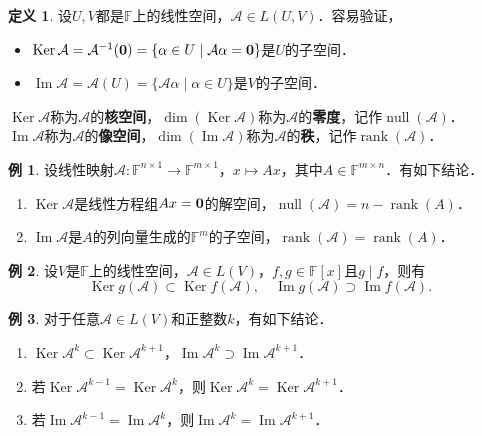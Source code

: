\documentclass[a4paper,fontset=windows]{ctexbook}
\theoremstyle{definition}
\newtheorem{definition}{定义}[chapter]
\newtheorem{example}{例}[chapter]
\DeclareMathOperator{\im}{Im}
\DeclareMathOperator{\Ker}{Ker}
\DeclareMathOperator{\Null}{null}
\DeclareMathOperator{\rank}{rank}
\begin{document}
\begin{definition}
设$U,V$都是$\mathbb{F}$上的线性空间，$\mathcal{A}\in L(U,V)$．容易验证，
\begin{itemize}
\item $\Ker\mathcal{A}=\mathcal{A}^{-1}({\bf 0})=\{\alpha\in U\mid\mathcal{A}\alpha={\bf 0}\}$是$U$的子空间．
\item $\im\mathcal{A}=\mathcal{A}(U)=\{\mathcal{A}\alpha\mid\alpha\in U\}$是$V$的子空间．
\end{itemize}
$\Ker\mathcal{A}$称为$\mathcal{A}$的{\bf 核空间}，$\dim(\Ker\mathcal{A})$称为$\mathcal{A}$的{\bf 零度}，记作$\Null(\mathcal{A})$．\\
$\im\mathcal{A}$称为$\mathcal{A}$的{\bf 像空间}，$\dim(\im\mathcal{A})$称为$\mathcal{A}$的{\bf 秩}，记作$\rank(\mathcal{A})$．
\end{definition}

\begin{example}
设线性映射$\mathcal{A}:\mathbb{F}^{n\times 1}\to\mathbb{F}^{m\times 1}$，$x\mapsto Ax$，其中$A\in\mathbb{F}^{m\times n}$．有如下结论．
\begin{enumerate}
\item $\Ker\mathcal{A}$是线性方程组$Ax={\bf 0}$的解空间，$\Null(\mathcal{A})=n-\rank(A)$．

\item $\im\mathcal{A}$是$A$的列向量生成的$\mathbb{F}^m$的子空间，$\rank(\mathcal{A})=\rank(A)$．
\end{enumerate}
\end{example}

\begin{example}
设$V$是$\mathbb{F}$上的线性空间，$\mathcal{A}\in L(V)$，$f,g\in\mathbb{F}[x]$且$g\mid f$，则有
$$\Ker g(\mathcal{A})\subset\Ker f(\mathcal{A}),\quad\im g(\mathcal{A})\supset\im f(\mathcal{A}).$$
\end{example}

\begin{example}
对于任意$\mathcal{A}\in L(V)$和正整数$k$，有如下结论．
\begin{enumerate}
\item $\Ker\mathcal{A}^k\subset\Ker\mathcal{A}^{k+1}$，$\im\mathcal{A}^k\supset\im\mathcal{A}^{k+1}$．

\item 若$\Ker\mathcal{A}^{k-1}=\Ker\mathcal{A}^k$，则$\Ker\mathcal{A}^k=\Ker\mathcal{A}^{k+1}$．

\item 若$\im\mathcal{A}^{k-1}=\im\mathcal{A}^k$，则$\im\mathcal{A}^k=\im\mathcal{A}^{k+1}$．
\end{enumerate}
\end{example}
\end{document}
